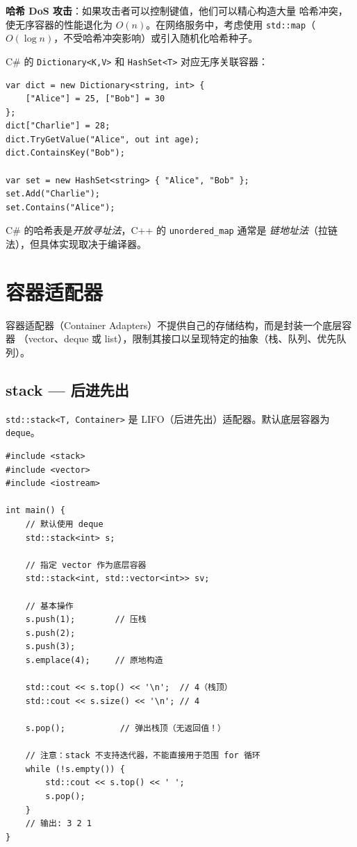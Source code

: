 \documentclass[12pt,a4paper,fontset=fandol]{ctexbook}
\newcommand{\Tp}[1]{\texttt{#1}}
\begin{document}
\begin{warning}
\textbf{哈希 DoS 攻击}：如果攻击者可以控制键值，他们可以精心构造大量
哈希冲突，使无序容器的性能退化为 $O(n)$。在网络服务中，考虑使用
\texttt{std::map}（$O(\log n)$，不受哈希冲突影响）或引入随机化哈希种子。
\end{warning}

\begin{compare}
C\# 的 \texttt{Dictionary<K,V>} 和 \texttt{HashSet<T>} 对应无序关联容器：
\begin{lstlisting}[style=csharpstyle]
var dict = new Dictionary<string, int> {
    ["Alice"] = 25, ["Bob"] = 30
};
dict["Charlie"] = 28;
dict.TryGetValue("Alice", out int age);
dict.ContainsKey("Bob");

var set = new HashSet<string> { "Alice", "Bob" };
set.Add("Charlie");
set.Contains("Alice");
\end{lstlisting}
C\# 的哈希表是\emph{开放寻址法}，C++ 的 \texttt{unordered\_map} 通常是
\emph{链地址法}（拉链法），但具体实现取决于编译器。
\end{compare}

\part{容器适配器}

容器适配器（Container Adapters）不提供自己的存储结构，而是封装一个底层容器
（vector、deque 或 list），限制其接口以呈现特定的抽象（栈、队列、优先队列）。

\chapter{stack --- 后进先出}

\Tp{std::stack<T, Container>} 是 LIFO（后进先出）适配器。默认底层容器为 \Tp{deque}。

\begin{lstlisting}
#include <stack>
#include <vector>
#include <iostream>

int main() {
    // 默认使用 deque
    std::stack<int> s;

    // 指定 vector 作为底层容器
    std::stack<int, std::vector<int>> sv;

    // 基本操作
    s.push(1);        // 压栈
    s.push(2);
    s.push(3);
    s.emplace(4);     // 原地构造

    std::cout << s.top() << '\n';  // 4（栈顶）
    std::cout << s.size() << '\n'; // 4

    s.pop();           // 弹出栈顶（无返回值！）

    // 注意：stack 不支持迭代器，不能直接用于范围 for 循环
    while (!s.empty()) {
        std::cout << s.top() << ' ';
        s.pop();
    }
    // 输出: 3 2 1
}
\end{lstlisting}
\end{document}
